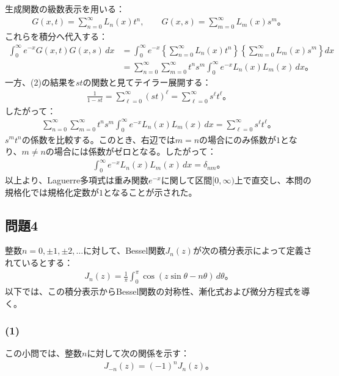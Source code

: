 \documentclass[platex,dvipdfmx,a4paper]{jsarticle}
\begin{document}
  生成関数の級数表示を用いる：
  \begin{align*}
    G(x,t)=\sum_{n=0}^{\infty}L_n(x)t^n,
    \qquad
    G(x,s)=\sum_{m=0}^{\infty}L_m(x)s^m。
  \end{align*}
  これらを積分へ代入する：
  \begin{align*}
    \int_0^\infty e^{-x}G(x,t)G(x,s)\,dx
    &=
    \int_0^\infty e^{-x}
    \left\{\sum_{n=0}^{\infty}L_n(x)t^n\right\}
    \left\{\sum_{m=0}^{\infty}L_m(x)s^m\right\}dx\\
    &=
    \sum_{n=0}^{\infty}\sum_{m=0}^{\infty}
    t^ns^m
    \int_0^\infty e^{-x}L_n(x)L_m(x)\,dx。
  \end{align*}
  一方、(2)の結果を$st$の関数と見てテイラー展開する：
  \begin{align*}
    \frac{1}{1-st}
    =\sum_{\ell=0}^{\infty}(st)^\ell
    =\sum_{\ell=0}^{\infty}s^\ell t^\ell。
  \end{align*}
  したがって：
  \begin{align*}
    \sum_{n=0}^{\infty}\sum_{m=0}^{\infty}
    t^ns^m
    \int_0^\infty e^{-x}L_n(x)L_m(x)\,dx
    =
    \sum_{\ell=0}^{\infty}s^\ell t^\ell。
  \end{align*}
  $s^mt^n$の係数を比較する。このとき、右辺では$m=n$の場合にのみ係数が$1$となり、$m\neq n$の場合には係数がゼロとなる。したがって：
  \begin{align*}
    \int_0^\infty e^{-x}L_n(x)L_m(x)\,dx
    =\delta_{nm}。
  \end{align*}
  以上より、Laguerre多項式は重み関数$e^{-x}$に関して区間$[0,\infty)$上で直交し、本問の規格化では規格化定数が$1$となることが示された。

  \subsection*{問題4}

  整数$n=0,\pm1,\pm2,\dots$に対して、Bessel関数$J_n(z)$が次の積分表示によって定義されているとする：
  \begin{align*}
    J_n(z)
    =\frac{1}{\pi}\int_0^\pi\cos(z\sin\theta-n\theta)\,d\theta。
  \end{align*}
  以下では、この積分表示からBessel関数の対称性、漸化式および微分方程式を導く。

  \subsubsection*{(1)}

  この小問では、整数$n$に対して次の関係を示す：
  \begin{align*}
    J_{-n}(z)=(-1)^nJ_n(z)。
  \end{align*}
\end{document}
